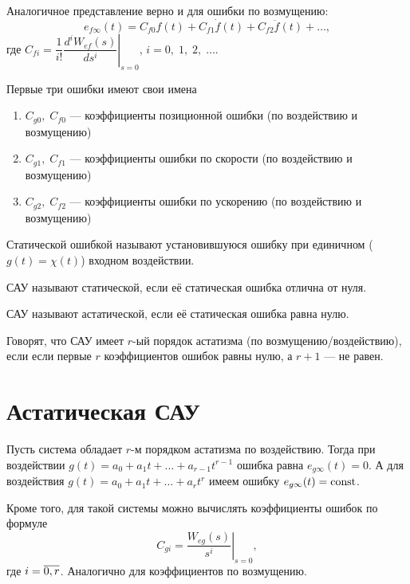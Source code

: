 \documentclass[../../TAU.tex]{subfiles}
\begin{document}
    Аналогичное представление верно и для ошибки по возмущению:
    $$
        e_{f\infty}(t) = C_{f0} f(t) + C_{f1} \dot f(t) + C_{f2} \ddot f(t) + \ldots,
    $$
    где $C_{fi} =\dfrac{1}{i!}\left.\dfrac{d^iW_{ef}(s)}{ds^i}\right|_{s=0}$, $i=0,\;1,\;2,\;\ldots$.

    Первые три ошибки имеют свои имена
    \begin{enumerate}
        \item $C_{g0},\; C_{f0}$ --- коэффициенты позиционной ошибки (по воздействию и возмущению)
        \item $C_{g1},\; C_{f1}$ --- коэффициенты ошибки по скорости (по воздействию и возмущению)
        \item $C_{g2},\; C_{f2}$ --- коэффициенты ошибки по ускорению (по воздействию и возмущению)
    \end{enumerate}

    \begin{defi}
    Статической ошибкой называют установившуюся ошибку при единичном ($g(t) = \chi(t)$) входном воздействии.
    \end{defi}

    \begin{defi}
    САУ называют статической, если её статическая ошибка отлична от нуля.
    \end{defi}

    \begin{defi}
    САУ называют астатической, если её статическая ошибка равна нулю.
    \end{defi}

    \begin{defi}
    Говорят, что САУ имеет $r$-ый порядок астатизма (по возмущению/воздействию), если если первые $r$ коэффициентов ошибок равны нулю, а $r+1$ --- не равен.
    \end{defi}

\section{Астатическая САУ}

    Пусть система обладает $r$-м порядком астатизма по воздействию. Тогда при воздействии $g(t) = a_0+a_1t+\ldots+ a_{r-1}t^{r-1}$ ошибка равна $e_{g\infty}(t) = 0$. А для воздействия $g(t) = a_0+a_1t+\ldots+ a_{r}t^{r}$ имеем ошибку $e_{g\infty}(t) = \mathop{\mathrm{const}}\nolimits$.

    Кроме того, для такой системы можно вычислять коэффициенты ошибок по формуле
    $$
        C_{gi} = \left.\dfrac{W_{eg}(s)}{s^i}\right|_{s=0},
    $$
    где $i = \overline{0,r}$. Аналогично для коэффициентов по возмущению.
\end{document}
